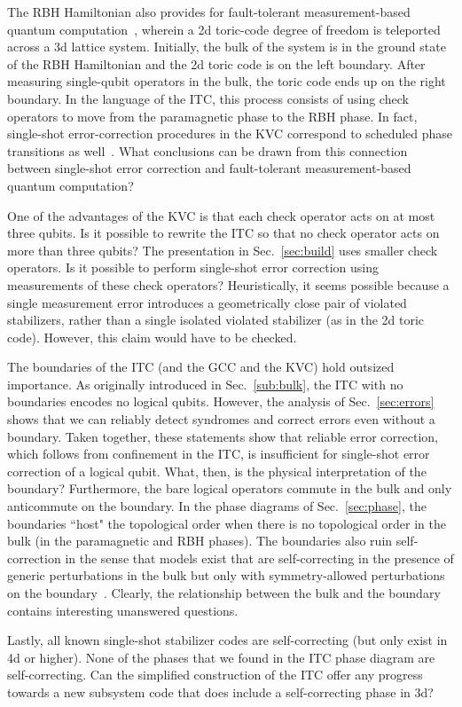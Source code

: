 The RBH Hamiltonian also provides for fault-tolerant measurement-based quantum computation~\cite{Raussendorf2006FaultTolerant}, wherein a 2d toric-code degree of freedom is teleported across a 3d lattice system. Initially, the bulk of the system is in the ground state of the RBH Hamiltonian and the 2d toric code is on the left boundary. After measuring single-qubit operators in the bulk, the toric code ends up on the right boundary. In the language of the ITC, this process consists of using check operators to move from the paramagnetic phase to the RBH phase. In fact, single-shot error-correction procedures in the KVC correspond to scheduled phase transitions as well~\cite{Li2023PhaseDiagram}. What conclusions can be drawn from this connection between single-shot error correction and fault-tolerant measurement-based quantum computation?

One of the advantages of the KVC is that each check operator acts on at most three qubits. Is it possible to rewrite the ITC so that no check operator acts on more than three qubits? The presentation in Sec.~\ref{sec:build} uses smaller check operators. Is it possible to perform single-shot error correction using measurements of these check operators? Heuristically, it seems possible because a single measurement error introduces a geometrically close pair of violated stabilizers, rather than a single isolated violated stabilizer (as in the 2d toric code). However, this claim would have to be checked.

The boundaries of the ITC (and the GCC and the KVC) hold outsized importance. As originally introduced in Sec.~\ref{sub:bulk}, the ITC with no boundaries encodes no logical qubits. However, the analysis of Sec.~\ref{sec:errors} shows that we can reliably detect syndromes and correct errors even without a boundary. Taken together, these statements show that reliable error correction, which follows from confinement in the ITC, is insufficient for single-shot error correction of a logical qubit. What, then, is the physical interpretation of the boundary? Furthermore, the bare logical operators commute in the bulk and only anticommute on the boundary. In the phase diagrams of Sec.~\ref{sec:phase}, the boundaries ``host" the topological order when there is no topological order in the bulk (in the paramagnetic and RBH phases). The boundaries also ruin self-correction in the sense that models exist that are self-correcting in the presence of generic perturbations in the bulk but only with symmetry-allowed perturbations on the boundary~\cite{Stahl2023Boundary}. Clearly, the relationship between the bulk and the boundary contains interesting unanswered questions.

Lastly, all known single-shot stabilizer codes are self-correcting (but only exist in 4d or higher). None of the phases that we found in the ITC phase diagram are self-correcting. Can the simplified construction of the ITC offer any progress towards a new subsystem code that does include a self-correcting phase in 3d?

